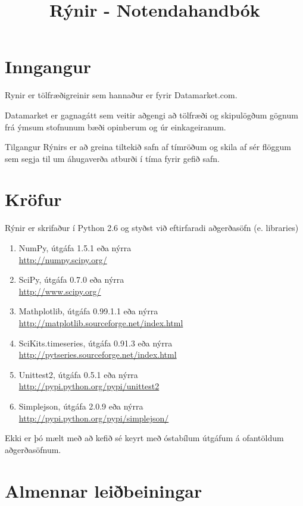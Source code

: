 \documentclass[11pt]{article}
\title{Rýnir - Notendahandbók}
\date{}
\begin{document}
\maketitle

\section{Inngangur}
Rynir er tölfræðigreinir sem hannaður er fyrir Datamarket.com.

Datamarket er gagnagátt sem veitir aðgengi að tölfræði og skipulögðum gögnum frá ýmsum stofnunum bæði opinberum og úr einkageiranum.

Tilgangur Rýnirs er að greina tiltekið safn af tímröðum og skila af sér flöggum sem segja til um áhugaverða atburði í tíma fyrir gefið safn.
 
\section{Kröfur}
Rýnir er skrifaður í Python 2.6 og styðst við eftirfaradi aðgerðasöfn (e. libraries)\\
\renewcommand{\theenumi}{\roman{enumi}}
\renewcommand{\labelenumi}{\theenumi}
\begin{enumerate}
 \item NumPy, útgáfa 1.5.1 eða nýrra\\ \url{http://numpy.scipy.org/}
 \item SciPy, útgáfa 0.7.0 eða nýrra\\ \url{http://www.scipy.org/}
 \item Mathplotlib, útgáfa 0.99.1.1 eða nýrra\\ \url{http://matplotlib.sourceforge.net/index.html}
 \item SciKits.timeseries, útgáfa 0.91.3 eða nýrra\\ \url{http://pytseries.sourceforge.net/index.html}
 \item Unittest2, útgáfa 0.5.1 eða nýrra\\ \url{http://pypi.python.org/pypi/unittest2}
 \item Simplejson, útgáfa 2.0.9 eða nýrra\\ \url{http://pypi.python.org/pypi/simplejson/}
\end{enumerate}

Ekki er þó mælt með að kefið sé keyrt með óstabílum útgáfum á ofantöldum aðgerðasöfnum.

\section{Almennar leiðbeiningar}
\end{document}
